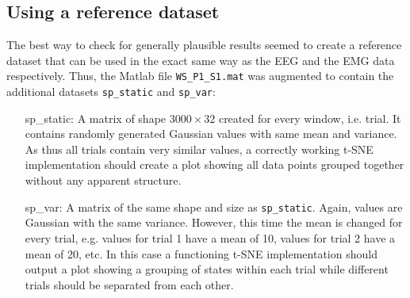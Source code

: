\documentclass{article} %
\begin{document}
\subsection{Using a reference dataset}
The best way to check for generally plausible results seemed to create a reference dataset that can be used in the exact same way as the EEG and the EMG data respectively. Thus, the Matlab file \verb|WS_P1_S1.mat| was augmented to contain the additional datasets \verb|sp_static| and \verb|sp_var|:


\begin{itemize}	
	\item[sp\_static:]  A matrix of shape $3000\times32$ created for every window, i.e. trial. It contains randomly generated Gaussian values with same mean and variance. As thus all trials contain very similar values, a correctly working t-SNE implementation should create a plot showing all data points grouped together without any apparent structure.
	\item[sp\_var:]  A matrix of the same shape and size as \verb|sp_static|. Again, values are Gaussian with the same variance. However, this time the mean is changed for every trial, e.g. values for trial 1 have a mean of 10, values for trial 2 have a mean of 20, etc. In this case a functioning t-SNE implementation should output a plot showing a grouping of states within each trial while different trials should be separated from each other.
\end{itemize}
\end{document}
